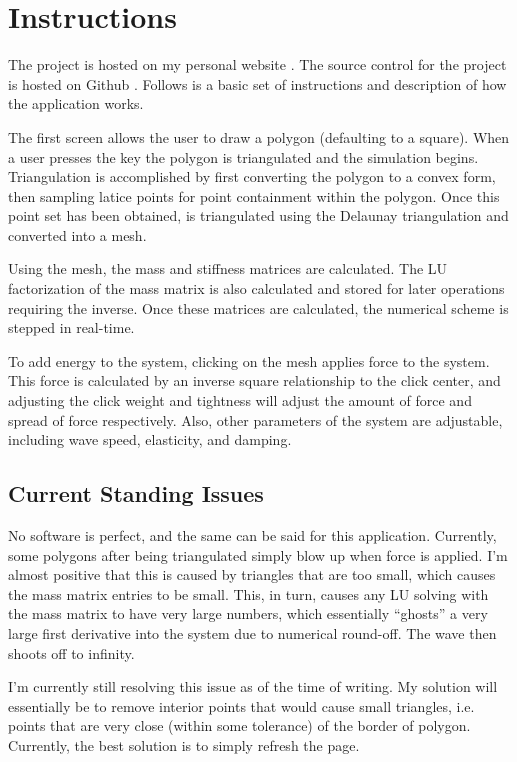 \section{Instructions}
The project is hosted on my personal website \cite{hosted_site}. The source control for the project is hosted on Github
\cite{github}. Follows is a basic set of instructions and description of how the application works.

The first screen allows the user to draw a polygon (defaulting to a square). When a user presses the key the polygon is
triangulated and the simulation begins. Triangulation is accomplished by first converting the polygon to a convex form,
then sampling latice points for point containment within the polygon. Once this point set has been obtained, is
triangulated using the Delaunay triangulation and converted into a mesh.

Using the mesh, the mass and stiffness matrices are calculated. The LU factorization of the mass matrix is also
calculated and stored for later operations requiring the inverse. Once these matrices are calculated, the numerical
scheme is stepped in real-time.

To add energy to the system, clicking on the mesh applies force to the system. This force is calculated by an inverse
square relationship to the click center, and adjusting the click weight and tightness will adjust the amount of force
and spread of force respectively. Also, other parameters of the system are adjustable, including wave speed,
elasticity, and damping.

\subsection{Current Standing Issues}
No software is perfect, and the same can be said for this application. Currently, some polygons after being triangulated
simply blow up when force is applied. I'm almost positive that this is caused by triangles that are too small, which
causes the mass matrix entries to be small. This, in turn, causes any LU solving with the mass matrix to have very large
numbers, which essentially ``ghosts'' a very large first derivative into the system due to numerical round-off. The wave
then shoots off to infinity.

I'm currently still resolving this issue as of the time of writing. My solution will essentially be to remove interior
points that would cause small triangles, i.e. points that are very close (within some tolerance) of the border of
polygon. Currently, the best solution is to simply refresh the page.
